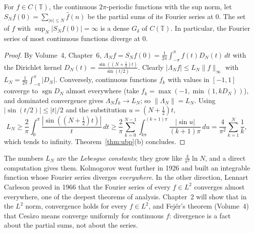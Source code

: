 \begin{theorem}\label{thm:fourierdiverge}
For $f\in C(\mathbb T)$, the continuous $2\pi$-periodic functions with the sup norm, let $S_Nf(0)=\sum_{|n|\le N}\hat f(n)$ be the partial sums of its Fourier series at $0$. The set of $f$ with
$\sup_N|S_Nf(0)|=\infty$ is a dense $G_\delta$ of $C(\mathbb T)$. In particular, the Fourier series of most continuous functions diverge at $0$.
\end{theorem}
\begin{proof}
By Volume~4, Chapter~6, $\Lambda_Nf=S_Nf(0)=\frac1{2\pi}\int_{-\pi}^\pi f(t)D_N(t)\,dt$ with the Dirichlet kernel $D_N(t)=\frac{\sin((N+\frac12)t)}{\sin(t/2)}$. Clearly $|\Lambda_Nf|\le L_N\|f\|_\infty$ with
$L_N=\frac1{2\pi}\int_{-\pi}^\pi|D_N|$. Conversely, continuous functions $f_k$ with values in $[-1,1]$ converge to $\operatorname{sgn}D_N$ almost everywhere (take $f_k=\max(-1,\min(1,kD_N))$), and dominated
convergence gives $\Lambda_Nf_k\to L_N$; so $\|\Lambda_N\|=L_N$. Using $|\sin(t/2)|\le|t|/2$ and the substitution $u=(N+\frac12)t$,
\[L_N\ge\frac2\pi\int_0^\pi\frac{|\sin((N+\frac12)t)|}t\,dt\ge\frac2\pi\sum_{k=0}^{N-1}\int_{k\pi}^{(k+1)\pi}\frac{|\sin u|}{(k+1)\pi}\,du=\frac4{\pi^2}\sum_{k=1}^N\frac1k,\]
which tends to infinity. Theorem~\ref{thm:ubp}(b) concludes.
\end{proof}

The numbers $L_N$ are the \emph{Lebesgue constants}; they grow like $\frac4{\pi^2}\ln N$, and a direct computation gives them. Kolmogorov went further in 1926 and built an integrable function whose Fourier series diverges
\emph{everywhere}. In the other direction, Lennart Carleson proved in 1966 that the Fourier series of every $f\in L^2$ converges almost everywhere, one of the deepest theorems of analysis. Chapter~2 will show that in
the $L^2$ norm, convergence holds for every $f\in L^2$, and Fej\'er's theorem (Volume~4) that Ces\`aro means converge uniformly for continuous $f$: divergence is a fact about the partial sums, not about the series.

